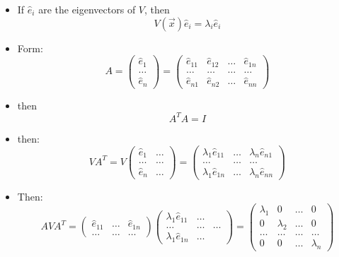 \begin{itemize}
    \item If $\hat{e}_i$ are the eigenvectors of $V$, then
          \[ V (\vec{x})\hat{e}_i = \lambda_i \hat{e}_i \]
    \item Form:
          \[ A = \begin{pmatrix}
                  \hat{e}_1 \\
                  \ldots    \\
                  \hat{e}_n
              \end{pmatrix}
              = \begin{pmatrix}
                  \hat{e}_{11} & \hat{e}_{12} & \ldots & \hat{e}_{1n} \\
                  \ldots       & \ldots       & \ldots & \ldots       \\
                  \hat{e}_{n1} & \hat{e}_{n2} & \ldots & \hat{e}_{nn}
              \end{pmatrix} \]
    \item then
          \[ A^T A = I \]
    \item then:
          \[ V A^T = V \begin{pmatrix}
                  \hat{e}_1 & \ldots \\
                  \ldots    & \ldots \\
                  \hat{e}_n & \ldots
              \end{pmatrix} = \begin{pmatrix}
                  \lambda_1 \hat{e}_{11} & \ldots & \lambda_n \hat{e}_{n1} \\
                  \ldots                 & \ldots & \ldots                 \\
                  \lambda_1 \hat{e}_{1n} & \ldots & \lambda_n \hat{e}_{nn}
              \end{pmatrix} \]

    \item Then:
          \[ A V A^T = \begin{pmatrix}
                  \hat{e}_{11} & \ldots & \hat{e}_{1n} \\
                  \ldots       & \ldots & \ldots
              \end{pmatrix}
              \begin{pmatrix}
                  \lambda_1 \hat{e}_{11} & \ldots          \\
                  \ldots                 & \ldots & \ldots \\
                  \lambda_1 \hat{e}_{1n} & \ldots
              \end{pmatrix}
              = \begin{pmatrix}
                  \lambda_1 & 0         & \ldots & 0         \\
                  0         & \lambda_2 & \ldots & 0         \\
                  \ldots    & \ldots    & \ldots & \ldots    \\
                  0         & 0         & \ldots & \lambda_n
              \end{pmatrix} \]


\end{itemize}
